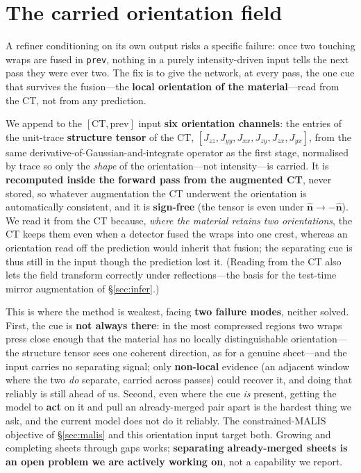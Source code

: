 \documentclass[10pt,twocolumn,a4paper]{article}
\newcommand{\nhat}{\ensuremath{\hat{\mathbf{n}}}}
\newcommand{\code}[1]{\texttt{#1}}
\begin{document}
\section{The carried orientation field}\label{sec:orient}
A refiner conditioning on its own output risks a specific failure: once two
touching wraps are fused in \code{prev}, nothing in a purely intensity-driven
input tells the next pass they were ever two. The fix is to give the network, at
every pass, the one cue that survives the fusion---the \textbf{local orientation
of the material}---read from the CT, not from any prediction.

We append to the $[\mathrm{CT},\mathrm{prev}]$ input \textbf{six orientation
channels}: the entries of the unit-trace \textbf{structure tensor} of the CT,
$[J_{zz},J_{yy},J_{xx},J_{zy},J_{zx},J_{yx}]$, from the same
derivative-of-Gaussian-and-integrate operator as the first stage, normalised by
trace so only the \emph{shape} of the orientation---not intensity---is carried. It
is \textbf{recomputed inside the forward pass from the augmented CT}, never stored,
so whatever augmentation the CT underwent the orientation is automatically
consistent, and it is \textbf{sign-free} (the tensor is even under
$\nhat\to-\nhat$). We read it from the CT because, \emph{where the material retains
two orientations}, the CT keeps them even when a detector fused the wraps into one
crest, whereas an orientation read off the prediction would inherit that fusion;
the separating cue is thus still in the input though the prediction lost it.
(Reading from the CT also lets the field transform correctly under reflections---the
basis for the test-time mirror augmentation of \S\ref{sec:infer}.)

This is where the method is weakest, facing \textbf{two failure modes}, neither
solved. First, the cue is \textbf{not always there}: in the most compressed
regions two wraps press close enough that the material has no locally
distinguishable orientation---the structure tensor sees one coherent direction,
as for a genuine sheet---and the input carries no separating signal; only
\textbf{non-local} evidence (an adjacent window where the two \emph{do} separate,
carried across passes) could recover it, and doing that reliably is still ahead of
us. Second, even where the cue \emph{is} present, getting the model to \textbf{act}
on it and pull an already-merged pair apart is the hardest thing we ask, and the
current model does not do it reliably. The constrained-MALIS objective of
\S\ref{sec:malis} and this orientation input target both. Growing and completing
sheets through gaps works; \textbf{separating already-merged sheets is an open
problem we are actively working on}, not a capability we report.
\end{document}
